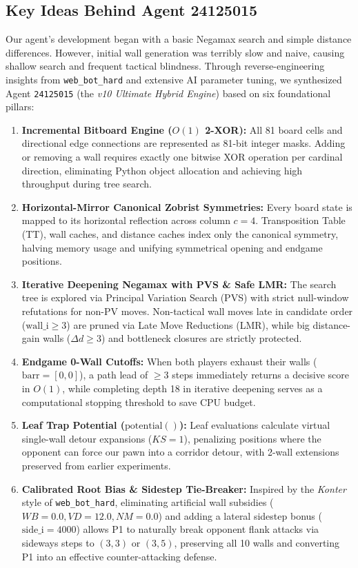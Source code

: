 \subsection{Key Ideas Behind Agent 24125015}
Our agent's development began with a basic Negamax search and simple distance differences. However, initial wall generation was terribly slow and naive, causing shallow search and frequent tactical blindness. Through reverse-engineering insights from \texttt{web\_bot\_hard} and extensive AI parameter tuning, we synthesized Agent \texttt{24125015} (the \textit{v10 Ultimate Hybrid Engine}) based on six foundational pillars:
\begin{enumerate}[leftmargin=1.5em]
    \item \textbf{Incremental Bitboard Engine ($O(1)$ 2-XOR):} All 81 board cells and directional edge connections are represented as 81-bit integer masks. Adding or removing a wall requires exactly one bitwise XOR operation per cardinal direction, eliminating Python object allocation and achieving high throughput during tree search.
    \item \textbf{Horizontal-Mirror Canonical Zobrist Symmetries:} Every board state is mapped to its horizontal reflection across column $c = 4$. Transposition Table (TT), wall caches, and distance caches index only the canonical symmetry, halving memory usage and unifying symmetrical opening and endgame positions.
    \item \textbf{Iterative Deepening Negamax with PVS \& Safe LMR:} The search tree is explored via Principal Variation Search (PVS) with strict null-window refutations for non-PV moves. Non-tactical wall moves late in candidate order ($\text{wall\_i} \ge 3$) are pruned via Late Move Reductions (LMR), while big distance-gain walls ($\Delta d \ge 3$) and bottleneck closures are strictly protected.
    \item \textbf{Endgame 0-Wall Cutoffs:} When both players exhaust their walls ($\text{barr} = [0, 0]$), a path lead of $\ge 3$ steps immediately returns a decisive score in $O(1)$, while completing depth 18 in iterative deepening serves as a computational stopping threshold to save CPU budget.
    \item \textbf{Leaf Trap Potential ($\text{potential}()$):} Leaf evaluations calculate virtual single-wall detour expansions ($KS = 1$), penalizing positions where the opponent can force our pawn into a corridor detour, with 2-wall extensions preserved from earlier experiments.
    \item \textbf{Calibrated Root Bias \& Sidestep Tie-Breaker:} Inspired by the \textit{Konter} style of \texttt{web\_bot\_hard}, eliminating artificial wall subsidies ($WB = 0.0, VD = 12.0, NM = 0.0$) and adding a lateral sidestep bonus ($\text{side\_i} = 4000$) allows P1 to naturally break opponent flank attacks via sideways steps to $(3,3)$ or $(3,5)$, preserving all 10 walls and converting P1 into an effective counter-attacking defense.
\end{enumerate}
